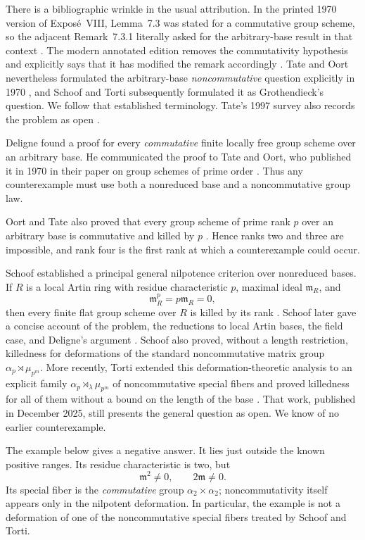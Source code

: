 \documentclass[11pt]{amsart}
\theoremstyle{remark}
\newcommand{\m}{\mathfrak m}
\begin{document}
There is a bibliographic wrinkle in the usual attribution.  In the
printed 1970 version of Expos\'e~VIII, Lemma~7.3 was stated for a
commutative group scheme, so the adjacent Remark~7.3.1 literally asked
for the arbitrary-base result in that context
\cite[Exp.~VIII, Lem.~7.3 and Rem.~7.3.1]{SGA3II}.  The modern
annotated edition removes the commutativity hypothesis and explicitly says that it
has modified the remark accordingly
\cite[notes (38)--(39)]{SGA3VIIIannotated}.  Tate and Oort nevertheless
formulated the arbitrary-base \emph{noncommutative} question explicitly
in 1970 \cite[p.~5]{OortTate}, and Schoof and Torti subsequently
formulated it as Grothendieck's question.  We follow that established
terminology.  Tate's 1997 survey also records the problem as open
\cite[\S3.8]{Tate1997}.

Deligne found a proof for every \emph{commutative} finite locally free
group scheme over an arbitrary base.  He communicated the proof to Tate
and Oort, who published it in 1970 in their paper on group schemes of
prime order \cite[\S1]{OortTate}.  Thus any counterexample must use both a
nonreduced base and a noncommutative group law.

Oort and Tate also proved that every group scheme of prime rank \(p\)
over an arbitrary base is commutative and killed by \(p\)
\cite[Thm.~1]{OortTate}.  Hence ranks two and three are impossible, and
rank four is the first rank at which a counterexample could occur.

Schoof established a principal general nilpotence criterion over
nonreduced bases.  If \(R\) is a local Artin ring with residue
characteristic \(p\), maximal ideal \(\m_R\), and
\[
 \m_R^p=p\m_R=0,
\]
then every finite flat group scheme over \(R\) is killed by its rank
\cite{Schoof2001}.  Schoof later gave a concise account of the problem,
the reductions to local Artin bases, the field case, and Deligne's
argument \cite{SchoofSurvey}.  Schoof also proved, without a length
restriction, killedness for deformations of the standard noncommutative
matrix group \(\alpha_p\rtimes\mu_{p^m}\).  More recently, Torti
extended this deformation-theoretic analysis to an explicit family
\(\alpha_p\rtimes_\lambda\mu_{p^m}\) of noncommutative special fibers and
proved killedness for all of them without a bound on the length of the
base \cite[Thms.~1.3--1.4]{Torti}.  That work, published in December
2025, still presents the general question as open.  We know of no earlier
counterexample.

The example below gives a negative answer.  It lies just outside the
known positive ranges.  Its residue characteristic is two, but
\[
 \m^2\ne0,\qquad 2\m\ne0.
\]
Its special fiber is the \emph{commutative} group
\(\alpha_2\times\alpha_2\); noncommutativity itself appears only in the
nilpotent deformation.  In particular, the example is not a deformation
of one of the noncommutative special fibers treated by Schoof and Torti.
\end{document}
